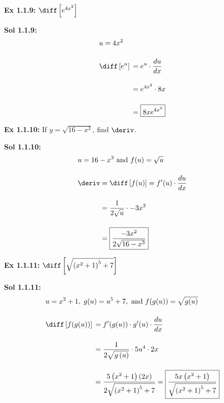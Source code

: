 \begin{tcolorbox}[example]
    \textbf{Ex 1.1.9: } $\diff \left[e^{4x^2}\right]$ 
\end{tcolorbox}
\begin{tcolorbox}[solution]
    \textbf{Sol 1.1.9: } \begin{align*}
        & u = 4x^2 \\[11pt]
        & \diff \left[e^u\right] \begin{aligned}[t]
            & = e^u \cdot \dfrac{du}{dx} \\[11pt]
            & = e^{4x^2} \cdot 8x \\[11pt]
            & = \boxed{8xe^{4x^2}}
        \end{aligned}
    \end{align*}
\end{tcolorbox} \vspace{11pt}

\begin{tcolorbox}[example]
    \textbf{Ex 1.1.10: } If $y = \sqrt{16 - x^3}$, find $\deriv$. 
\end{tcolorbox}
\begin{tcolorbox}[solution]
    \textbf{Sol 1.1.10: } \begin{align*}
        & u = 16 - x^3 \text{ and } f(u) = \sqrt{u} \\[11pt]
        & \deriv \begin{aligned}[t]
            & = \diff \left[f(u)\right] = f'(u) \cdot \dfrac{du}{dx} \\[11pt] 
            & = \dfrac{1}{2\sqrt{u}} \cdot -3x^2 \\[11pt]
            & = \boxed{\dfrac{-3x^2}{2\sqrt{16 - x^3}}}
        \end{aligned}
    \end{align*} 
\end{tcolorbox} \vspace{11pt}

\begin{tcolorbox}[example]
    \textbf{Ex 1.1.11: } $\diff \left[\sqrt{\left(x^2 + 1\right)^5 + 7}\right]$
\end{tcolorbox}
\begin{tcolorbox}[solution]
    \textbf{Sol 1.1.11: }\begin{align*}
        & u = x^2 + 1, \; g(u) = u^5 + 7, \text{ and } f(g(u)) = \sqrt{g(u)} \\[11pt]
        & \diff \left[f(g(u))\right] \begin{aligned}[t]
            & = f'(g(u)) \cdot g'(u) \cdot \dfrac{du}{dx} \\[11pt]
            & = \dfrac{1}{2\sqrt{g\left(u\right)}} \cdot 5u^4 \cdot 2x \\[11pt]
            & = \dfrac{5\left(x^2 + 1\right)(2x)}{2\sqrt{\left(x^2 + 1\right)^5 + 7}} = \boxed{\dfrac{5x\left(x^2 + 1\right)}{\sqrt{\left(x^2 + 1\right)^5 + 7}}}
        \end{aligned}
    \end{align*}
\end{tcolorbox}

